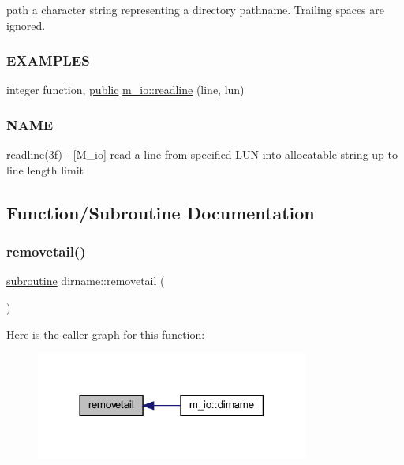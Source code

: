 \begin{DoxyCompactItemize}
\begin{DoxyCompactList}
path a character string representing a directory pathname. Trailing spaces are ignored. \subsubsection*{E\+X\+A\+M\+P\+L\+ES}\end{DoxyCompactList}\item 
integer function, \hyperlink{M__stopwatch_83_8txt_a2f74811300c361e53b430611a7d1769f}{public} \hyperlink{namespacem__io_a8d9ee59e21830662fa59c300ca23e04b}{m\+\_\+io\+::readline} (line, lun)
\begin{DoxyCompactList}\small\item\em \subsubsection*{N\+A\+ME}

readline(3f) -\/ \mbox{[}M\+\_\+io\mbox{]} read a line from specified L\+UN into allocatable string up to line length limit \end{DoxyCompactList}\end{DoxyCompactItemize}


\subsection{Function/\+Subroutine Documentation}
\mbox{\label{M__io_8f90_af19c15eaa4f2a0ca08d241277ce7c256}} 
\subsubsection{\texorpdfstring{removetail()}{removetail()}}
{\footnotesize\ttfamily \hyperlink{M__stopwatch_83_8txt_acfbcff50169d691ff02d4a123ed70482}{subroutine} dirname\+::removetail (\begin{DoxyParamCaption}{ }\end{DoxyParamCaption})\hspace{0.3cm}{\ttfamily [private]}}

Here is the caller graph for this function\+:
\nopagebreak
\begin{figure}[H]
\begin{center}
\leavevmode
\includegraphics[width=254pt]{M__io_8f90_af19c15eaa4f2a0ca08d241277ce7c256_icgraph}
\end{center}
\end{figure}
\mbox{\label{M__io_8f90_a448cccd08d4d6bce645ffbbf14cdfa7e}} 
